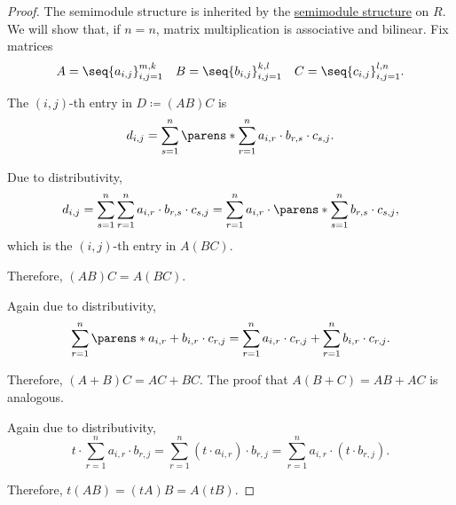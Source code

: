 \begin{proof}
  The semimodule structure is inherited by the \hyperref[thm:semiring_is_semimodule]{semimodule structure} on \( R \). We will show that, if \( n = n \), matrix multiplication is associative and bilinear. Fix matrices
  \begin{equation*}
    \begin{aligned}
      A = \seq{ a_{i,j} }_{i,j=1}^{m,k} && B = \seq{ b_{i,j} }_{i,j=1}^{k,l} && C = \seq{ c_{i,j} }_{i,j=1}^{l,n}.
    \end{aligned}
  \end{equation*}

   The \( (i, j) \)-th entry in \( D \coloneqq (AB)C \) is
  \begin{equation*}
    d_{i,j} = \sum_{s=1}^n \parens*{ \sum_{r=1}^n a_{i,r} \cdot b_{r,s} } \cdot c_{s,j}.
  \end{equation*}

  Due to distributivity,
  \begin{equation*}
    d_{i,j}
    =
    \sum_{s=1}^n \sum_{r=1}^n a_{i,r} \cdot b_{r,s} \cdot c_{s,j}
    =
    \sum_{r=1}^n a_{i,r} \cdot \parens*{ \sum_{s=1}^n b_{r,s} \cdot c_{s,j} },
  \end{equation*}
  which is the \( (i, j) \)-th entry in \( A(BC) \).

  Therefore, \( (AB)C = A(BC) \).

   Again due to distributivity,
  \begin{equation*}
    \sum_{r=1}^n \parens*{ a_{i,r} + b_{i,r} } \cdot c_{r,j}
    =
    \sum_{r=1}^n a_{i,r} \cdot c_{r,j} + \sum_{r=1}^n b_{i,r} \cdot c_{r,j}.
  \end{equation*}

  Therefore, \( (A + B)C = AC + BC \). The proof that \( A(B + C) = AB + AC \) is analogous.

   Again due to distributivity,
  \begin{equation*}
    t \cdot \sum_{r=1}^n a_{i,r} \cdot b_{r,j}
    =
    \sum_{r=1}^n (t \cdot a_{i,r}) \cdot b_{r,j}
    =
    \sum_{r=1}^n a_{i,r} \cdot (t \cdot b_{r,j}).
  \end{equation*}

  Therefore, \( t(AB) = (tA)B = A(tB) \).
\end{proof}

